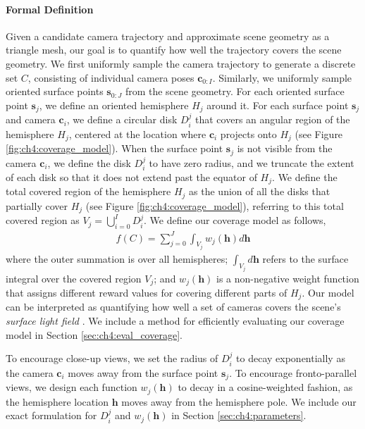 \paragraph{Formal Definition}
Given a candidate camera trajectory and approximate scene geometry as a triangle mesh, our goal is to quantify how well the trajectory covers the scene geometry.
We first uniformly sample the camera trajectory to generate a discrete set $C$, consisting of individual camera poses $\mathbf{c}_{0:I}$.
Similarly, we uniformly sample oriented surface points $\mathbf{s}_{0:J}$ from the scene geometry.
For each oriented surface point $\mathbf{s}_j$, we define an oriented hemisphere $H_j$ around it.
For each surface point $\mathbf{s}_j$ and camera $\mathbf{c}_i$, we define a circular disk $D^j_i$ that covers an angular region of the hemisphere $H_j$, centered at the location where $\mathbf{c}_i$ projects onto $H_j$ (see Figure \ref{fig:ch4:coverage_model}).
When the surface point $\mathbf{s}_j$ is not visible from the camera $\mathbf{c}_i$, we define the disk $D^j_i$ to have zero radius, and we truncate the extent of each disk so that it does not extend past the equator of $H_j$.
We define the total covered region of the hemisphere $H_j$ as the union of all the disks that partially cover $H_j$ (see Figure \ref{fig:ch4:coverage_model}), referring to this total covered region as $V_j = \bigcup_{i=0}^I D^j_i$.
We define our coverage model as follows,
%
\begin{equation}
\begin{aligned}
f(C) = \sum_{j=0}^{J} \int_{V_j} w_j(\mathbf{h}) d\mathbf{h}
\end{aligned}
\label{eqn:ch4:model_irregular}
\end{equation}
%
where the outer summation is over all hemispheres; $\int_{V_j} d\mathbf{h}$ refers to the surface integral over the covered region $V_j$; and $w_j(\mathbf{h})$ is a non-negative weight function that assigns different reward values for covering different parts of $H_j$.
Our model can be interpreted as quantifying how well a set of cameras covers the scene's \emph{surface light field} \cite{davis:2012,wood:2000}.
We include a method for efficiently evaluating our coverage model in Section \ref{sec:ch4:eval_coverage}.

To encourage close-up views, we set the radius of $D^j_i$ to decay exponentially as the camera $\mathbf{c}_i$ moves away from the surface point $\mathbf{s}_j$. To encourage fronto-parallel views, we design each function $w_j(\mathbf{h})$ to decay in a cosine-weighted fashion, as the hemisphere location $\mathbf{h}$ moves away from the hemisphere pole.
We include our exact formulation for $D^j_i$ and $w_j(\mathbf{h})$ in Section \ref{sec:ch4:parameters}.

